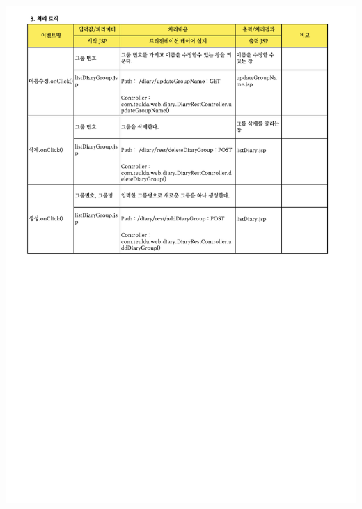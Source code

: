 {{{{{{{{{{{{{{{{{{{{{{{{{{{{{{{{{{{{\includegraphics[width=20cm]{./Figure/Design/Display/diary/diary_18.pdf} \\
}}}}}}}}}}}}}}}}}}}}}}}}}}}}}}}}}}}}
